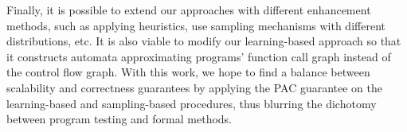 Finally, it is possible to extend our approaches with different enhancement methods, such as applying heuristics, use sampling mechanisms with different distributions, etc. It is also viable to modify our learning-based approach so that it constructs automata approximating programs' function call graph instead of the control flow graph. With this work, we hope to find a balance between scalability and correctness guarantees by applying the PAC guarantee on the learning-based and sampling-based procedures, thus blurring the dichotomy between program testing and formal methods. 

\begin{comment}

The number of iterations is perhaps the most important factor in our
recursion analysis technique (Table~\ref{table:experiments}) as it would
determine how many times of unwinding are applied.
We find that \textsc{CPAchecker} performs poorly when checking programs
that is unwound many times.
We however do not enable the more efficient block encoding in
\textsc{CPAchecker} for the ease of implementation.
One can improve the performance of our algorithm with the efficient but
complicated block encoding.
A bounded analyzer may also speed up the verification of bounded properties.

Our algorithm extracts function summaries from inductive invariants.
There are certainly many heuristics to optimize the computation of
function summaries.
For instance, some program analyzers return error traces when properties fail.
In particular, a valuation of formal parameters is obtained when
\textmd{CheckSummary} (Algorithm~\ref{algorithm:check-summary}) returns $\FF$.
If the valuation is not possible in the $\fun{main}$ function, one can use
its inductive invariant to refine function summaries.
We in fact exploit error traces computed by \textsc{CPAchecker} in the
implementation.

Another improvement on our algorithm is on selecting locations for extracting
inductive invariants.
In Algorithm~\ref{algorithm:mark-locations}, we select only outermost pairs of
locations for calls to the same function.
This is based on the observation that the unwound bodies of these function calls
contain more execution paths,
and hence their behaviors should be closer to the original function.
However, the extracted invariants in $s_i$ may be too precise to those certain
function calls and result in too coarse summary candidates constructed by
implication connective,
and consequently the candidates can not pass \textmd{CheckSummary} due to inner
function calls are not properly approximated.
Therefore, heuristics that select some locations of inner function calls may help
compute summary candidates with better quality.


\end{comment}
